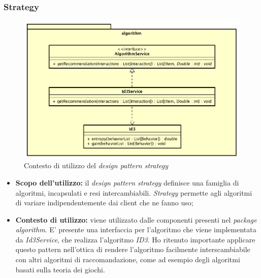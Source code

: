 \subsubsection{Strategy}
\begin{figure}[h]
\centering
\includegraphics[scale=0.30]{immagini/algorithm}
\caption{Contesto di utilizzo del \emph{design pattern strategy}}
\label{fig:pattern-strategy}
\end{figure}
\begin{itemize}
\item\textbf{Scopo dell'utilizzo:} il \emph{design pattern strategy} definisce una famiglia di algoritmi, incapsulati e resi intercambiabili. \emph{Strategy} permette agli algoritmi di variare indipendentemente dai client che ne fanno uso;
\item \textbf{Contesto di utilizzo:} viene utilizzato dalle componenti presenti nel \emph{package algorithm}. E' presente una interfaccia per l'algoritmo che viene implementata da \emph{Id3Service}, che realizza l'algoritmo \emph{ID3}. Ho ritenuto importante applicare questo pattern nell'ottica di rendere l'algoritmo facilmente interscambiabile con altri algoritmi di raccomandazione, come ad esempio degli algoritmi basati sulla teoria dei giochi.
\end{itemize}
\newpage
